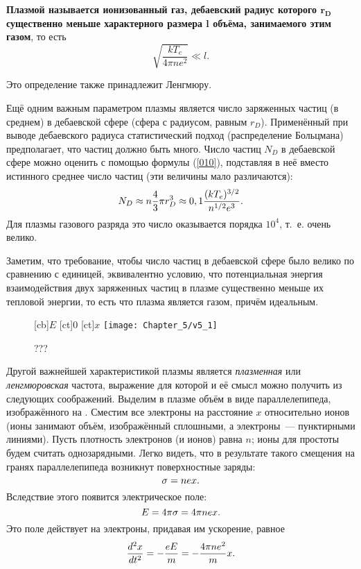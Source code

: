 {\bf Плазмой называется ионизованный газ, дебаевский радиус которого $\boldsymbol{r_D}$ существенно меньше характерного
размера $\boldsymbol{l}$ объёма, занимаемого этим газом}, то есть
\begin{equation*}
	\sqrt{\frac{kT_e}{4\pi ne^2}}\ll l.
\end{equation*}

Это определение также принадлежит Ленгмюру.

Ещё одним важным параметром плазмы является число заряженных частиц (в среднем) в дебаевской сфере (сфера с радиусом,
равным $r_D$). Применённый при выводе дебаевского радиуса статистический подход (распределение Больцмана) предполагает,
что частиц должно быть много. Число частиц $N_D$ в дебаевской сфере можно оценить с помощью формулы (\eqref{010}),
подставляя в неё вместо истинного среднее число частиц (эти величины мало различаются):
\begin{equation}
	\eqmark[41l]
	N_D\approx n\frac43\pi r_D^3\approx0,1\frac{(kT_e)^{3/2}}{n^{1/2}e^3}.
\end{equation}
Для плазмы газового разряда это число оказывается порядка $10^4$, т.~е. очень велико.

Заметим, что требование, чтобы число частиц в дебаевской сфере было велико по сравнению с единицей, эквивалентно
условию, что потенциальная энергия взаимодействия двух заряженных частиц в плазме существенно меньше их тепловой
энергии, то есть что плазма является газом, причём идеальным.

\begin{wrapfigure}{o}{0.3\textwidth}
	[cb]{$E$}
	[ct]{0}
	[ct]{$x$}
	\texttt{[image: Chapter\_5/v5\_1]}
	\caption{???}
	\figmark[1]
\end{wrapfigure}

Другой важнейшей характеристикой плазмы является \textit{плазменная} или \textit{ленгмюровская} частота, выражение для
которой и её смысл можно получить из следующих соображений. Выделим в плазме объём в виде параллелепипеда, изображённого
на . Сместим все электроны на расстояние $x$ относительно ионов (ионы занимают объём, изображённый сплошными, а
электроны~--- пунктирными линиями). Пусть плотность электронов (и ионов) равна $n$; ионы для простоты будем считать
однозарядными. Легко видеть, что в результате такого смещения на гранях параллелепипеда возникнут поверхностные заряды:
\begin{equation}
	\eqmark[012]
	\sigma=nex.
\end{equation}
Вследствие этого появится электрическое поле:
\begin{equation}
	\eqmark[013]
	E=4\pi\sigma=4\pi nex.
\end{equation}
Это поле действует на электроны, придавая им ускорение, равное
\begin{equation}
	\eqmark[014]
	\frac{d^2x}{dt^2}=-\frac{eE}{m}=-\frac{4\pi ne^2}{m}x.
\end{equation}

